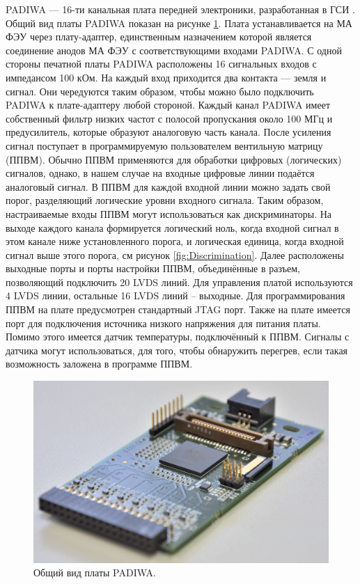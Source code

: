 PADIWA --- 16-ти канальная плата передней электроники, разработанная в ГСИ \cite{}. Общий вид платы PADIWA показан на рисунке \ref{fig:PADIWA}. Плата устанавливается на МА ФЭУ через плату-адаптер, единственным назначением которой является соединение анодов МА ФЭУ с соответствующими входами PADIWA. С одной стороны печатной платы PADIWA расположены 16 сигнальных входов с импедансом 100 кОм. На каждый вход приходится два контакта --- земля и сигнал. Они чередуются таким образом, чтобы можно было подключить PADIWA к плате-адаптеру любой стороной. Каждый канал PADIWA имеет собственный фильтр низких частот с полосой пропускания около 100 МГц  и предусилитель, которые образуют аналоговую часть канала. После усиления сигнал поступает в программируемую пользователем вентильную матрицу (ППВМ). Обычно ППВМ применяются для обработки цифровых (логических) сигналов, однако, в нашем случае на входные цифровые линии подаётся аналоговый сигнал. В ППВМ для каждой входной линии можно задать свой порог, разделяющий логические уровни входного сигнала. Таким образом, настраиваемые входы ППВМ могут использоваться как дискриминаторы. На выходе каждого канала формируется логический ноль, когда входной сигнал в этом канале ниже установленного порога, и логическая единица, когда входной сигнал выше этого порога, см рисунок \ref{fig:Discrimination}. Далее расположены выходные порты и порты настройки ППВМ, объединённые в разъем, позволяющий подключить 20 LVDS линий. Для управления платой используются 4 LVDS линии, остальные 16 LVDS линий – выходные. Для программирования ППВМ на плате предусмотрен стандартный JTAG порт. Также на плате имеется порт для подключения источника низкого напряжения для питания платы. Помимо этого имеется датчик температуры, подключённый к ППВМ. Сигналы с датчика могут использоваться, для того, чтобы обнаружить перегрев, если такая возможность заложена в программе ППВМ.

\begin{figure}
\includegraphics[width=1.0\textwidth]{pictures/5_padiwa_lowres.jpg}
\caption{Общий вид платы PADIWA.}
\label{fig:PADIWA}
\end{figure}

